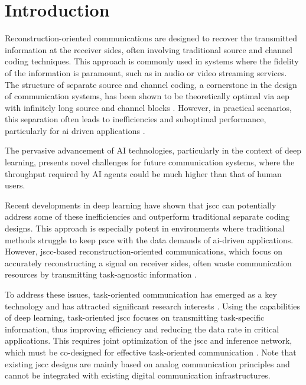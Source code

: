 \section{Introduction}
\label{sec:introduction}
Reconstruction-oriented communications are designed to recover the transmitted information at the receiver sides, often involving traditional source and channel coding techniques. This approach is commonly used in systems where the fidelity of the information is paramount, such as in audio or video streaming services. The structure of separate source and channel coding, a cornerstone in the design of communication systems, has been shown to be theoretically optimal via \gls{aep} with infinitely long source and channel blocks \cite{Cover_1991_EoI}. However, in practical scenarios, this separation often leads to inefficiencies and suboptimal performance, particularly for \gls{ai} driven applications \cite{Bourtsoulatze_2019_DJS}.

The pervasive advancement of AI technologies, particularly in the context of deep learning, presents novel challenges for future communication systems, where the throughput required by AI agents could be much higher than that of human users.

Recent developments in deep learning have shown that \gls{jscc} can potentially address some of these inefficiencies and outperform traditional separate coding designs. This approach is especially potent in environments where traditional methods struggle to keep pace with the data demands of \gls{ai}-driven applications. However, \gls{jscc}-based reconstruction-oriented communications, which focus on accurately reconstructing a signal on receiver sides, often waste communication resources by transmitting task-agnostic information \cite{Kurka_2020_DfD}.

To address these issues, task-oriented communication has emerged as a key technology and has attracted significant research interests \cite{Shao_2022_LTO, Shao_2023_TOC, Stavrou_2022_ARD, Shi_2023_TOC}. Using the capabilities of deep learning, task-oriented \gls{jscc} focuses on transmitting task-specific information, thus improving efficiency and reducing the data rate in critical applications. This requires joint optimization of the \gls{jscc} and inference network, which must be co-designed for effective task-oriented communication \cite{Shao_2022_LTO}. Note that existing \gls{jscc} designs are mainly based on analog communication principles \cite{Bourtsoulatze_2019_DJS} and cannot be integrated with existing digital communication infrastructures.

